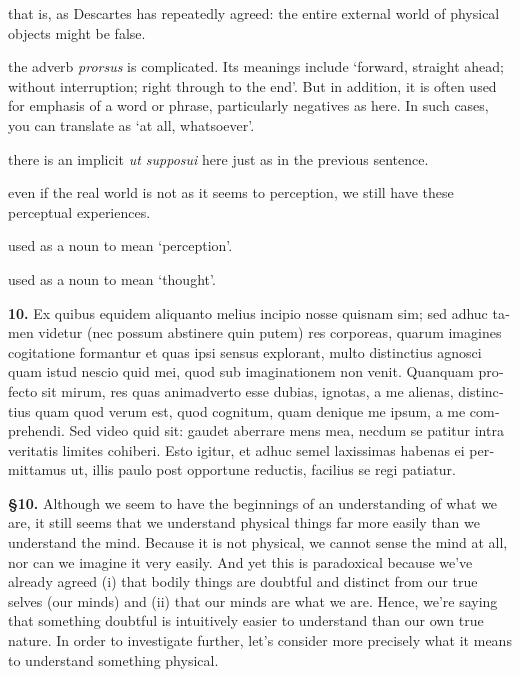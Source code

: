  that is, as Descartes has repeatedly agreed: the entire external world of physical objects might be false.

 the adverb \textit{prorsus} is complicated. Its meanings include `forward, straight ahead; without interruption; right through to the end'. But in addition, it is often used for emphasis of a word or phrase, particularly negatives as here. In such cases, you can translate as `at all, whatsoever'.

 there is an implicit \textit{ut supposui} here just as in the previous sentence.

 even if the real world is not as it seems to perception, we still have these perceptual experiences.

 used as a noun to mean `perception'.

 used as a noun to mean `thought'.

\clearpage

\beginnumbering
\pstart
\begin{latin}
    \textenglish{\textbf{10.}} Ex quibus equidem aliquanto melius incipio nosse quisnam sim; sed adhuc tamen videtur (nec possum abstinere quin putem) res corporeas, quarum imagines cogitatione formantur et quas ipsi sensus explorant, multo distinctius agnosci quam istud nescio quid mei, quod sub imaginationem non venit. Quanquam profecto sit mirum, res quas animadverto esse dubias, ignotas, a me alienas, distinctius quam quod verum est, quod cognitum, quam denique me ipsum, a me comprehendi. Sed video quid sit: gaudet aberrare mens mea, necdum se patitur intra veritatis limites cohiberi. Esto igitur, et adhuc semel laxissimas habenas ei permittamus ut, illis paulo post opportune reductis, facilius se regi patiatur.
\end{latin}
\pend
\endnumbering

\prenotes

\textbf{§10.} Although we seem to have the beginnings of an understanding of what we are, it still seems that we understand physical things far more easily than we understand the mind. Because it is not physical, we cannot sense the mind at all, nor can we imagine it very easily. And yet this is paradoxical because we've already agreed (i) that bodily things are doubtful and distinct from our true selves (our minds) and (ii) that our minds are what we are. Hence, we're saying that something doubtful is intuitively easier to understand than our own true nature. In order to investigate further, let's consider more precisely what it means to understand something physical.


